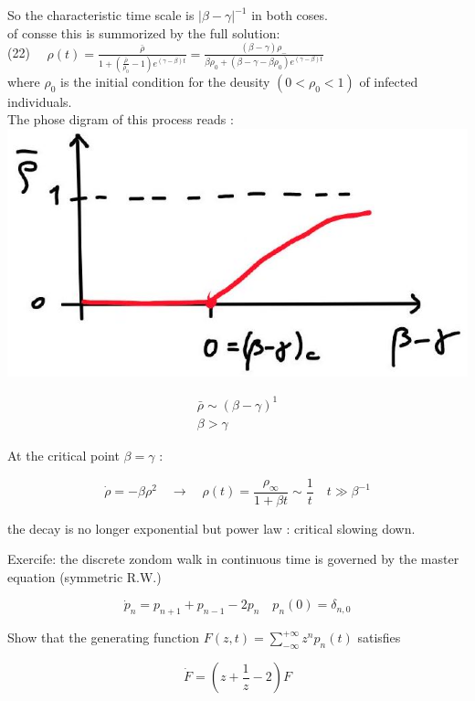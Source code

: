 \documentclass[10pt]{article}
\begin{document}
So the characteristic time scale is $|\beta-\gamma|^{-1}$ in both coses.\\
of consse this is summorized by the full solution:\\
(22) $\quad \rho(t)=\frac{\bar{\rho}}{1+\left(\frac{\bar{\rho}}{\rho_{0}}-1\right) e^{(\gamma-\beta) t}}=\frac{(\beta-\gamma) \rho_{-}}{\beta \rho_{0}+\left(\beta-\gamma-\beta \rho_{0}\right) e^{(\gamma-\beta) t}}$\\
where $\rho_{0}$ is the initial condition for the deusity $\left(0<\rho_{0}<1\right)$ of infected individuals.\\
The phose digram of this process reads :\\
\includegraphics[max width=\textwidth, center]{2025_10_17_3daf2a002a8f5936c90eg-13}

$$
\begin{gathered}
\bar{\rho} \sim(\beta-\gamma)^{1} \\
\beta>\gamma
\end{gathered}
$$

At the critical point $\beta=\gamma$ :

$$
\dot{\rho}=-\beta \rho^{2} \quad \rightarrow \quad \rho(t)=\frac{\rho_{\infty}}{1+\beta t} \sim \frac{1}{t} \quad t \gg \beta^{-1}
$$

the decay is no longer exponential but power law : critical slowing down.

Exercife: the discrete zondom walk in continuous time is governed by the master equation (symmetric R.W.)

$$
\dot{p}_{n}=p_{n+1}+p_{n-1}-2 p_{n} \quad p_{n}(0)=\delta_{n, 0}
$$

Show that the generating function $F(z, t)=\sum_{-\infty}^{+\infty} z^{n} p_{n}(t)$ satisfies

$$
\dot{F}=\left(z+\frac{1}{z}-2\right) F
$$
\end{document}
